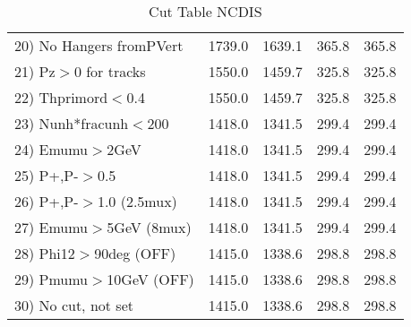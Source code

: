 \begin{table}[h!]
\begin{tabular}{||l||r|r|r|r||}
 20) No Hangers fromPVert &      1739.0 &      1639.1 &       365.8 &       365.8 \\
 21) Pz$>$0 for tracks    &      1550.0 &      1459.7 &       325.8 &       325.8 \\
 22) Thprimord$<$0.4      &      1550.0 &      1459.7 &       325.8 &       325.8 \\
 23) Nunh*fracunh$<$200   &      1418.0 &      1341.5 &       299.4 &       299.4 \\
 24) Emumu$>$2GeV         &      1418.0 &      1341.5 &       299.4 &       299.4 \\
 25) P+,P-$>$0.5          &      1418.0 &      1341.5 &       299.4 &       299.4 \\
 26) P+,P-$>$1.0 (2.5mux) &      1418.0 &      1341.5 &       299.4 &       299.4 \\
 27) Emumu$>$5GeV  (8mux) &      1418.0 &      1341.5 &       299.4 &       299.4 \\
 28) Phi12$>$90deg  (OFF) &      1415.0 &      1338.6 &       298.8 &       298.8 \\
 29) Pmumu$>$10GeV  (OFF) &      1415.0 &      1338.6 &       298.8 &       298.8 \\
 30) No cut, not set      &      1415.0 &      1338.6 &       298.8 &       298.8 \\
 \hline
 \hline
 \end{tabular}
 \caption{Cut Table  NCDIS  }
 \label{tab-cut_ncdis}
 \end{table}
